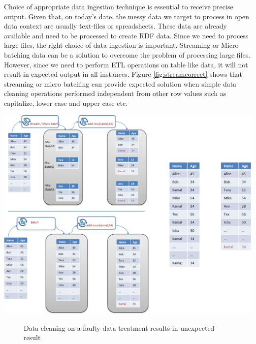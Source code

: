  Choice of appropriate data ingestion technique is essential to receive precise output. Given that, on today's date, the messy data we target to process in open data context are usually text-files or spreadsheets. These data are already available and need to be processed to create RDF data. 
 Since we need to process large files, the right choice of data ingestion is important. Streaming or Micro batching data can be a solution to overcome the problem of processing large files. However, since we need to perform ETL operations on table like data, it will not result in expected output in all instances. Figure \ref{fig:streamcorrect} shows that streaming or micro batching can provide expected solution when simple data cleaning operations performed independent from other row values such as capitalize, lower case and upper case etc. 
 \begin{center}
	\includegraphics[width=38em]{./Figures/batch-cleaning-wrong}
	\begin{figure}[htbp]
    \caption{Data cleaning on a faulty data treatment results in unexpected result}
    \label{fig:stream-wrong}
	\end{figure}
\end{center}
